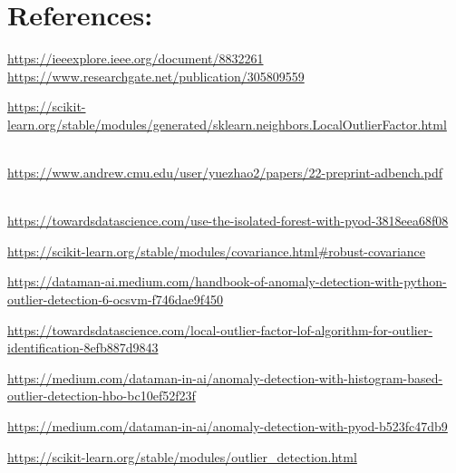 \documentclass{article}
\begin{document}
\section{References:}
\begin{thebibliography}{9}
    \href{https://ieeexplore.ieee.org/document/8832261}{https://ieeexplore.ieee.org/document/8832261}
    \href{https://www.researchgate.net/publication/305809559}{https://www.researchgate.net/publication/305809559}
  
    \url{https://scikit-learn.org/stable/modules/generated/sklearn.neighbors.LocalOutlierFactor.html}
  
    \\ \url{https://www.andrew.cmu.edu/user/yuezhao2/papers/22-preprint-adbench.pdf}

    \\ \url{https://towardsdatascience.com/use-the-isolated-forest-with-pyod-3818eea68f08}

   \href{Minimum Covariance Determinant}
  \url{https://scikit-learn.org/stable/modules/covariance.html\#robust-covariance}

   
  \url{https://dataman-ai.medium.com/handbook-of-anomaly-detection-with-python-outlier-detection-6-ocsvm-f746dae9f450}

    \url{https://towardsdatascience.com/local-outlier-factor-lof-algorithm-for-outlier-identification-8efb887d9843}

    \url{https://medium.com/dataman-in-ai/anomaly-detection-with-histogram-based-outlier-detection-hbo-bc10ef52f23f}

    \url{https://medium.com/dataman-in-ai/anomaly-detection-with-pyod-b523fc47db9}

    \url{https://scikit-learn.org/stable/modules/outlier_detection.html}


\end{thebibliography}
\end{document}
